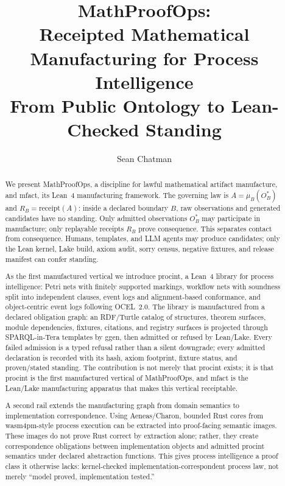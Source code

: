 \documentclass[11pt]{article}
\title{MathProofOps:\\Receipted Mathematical Manufacturing for Process Intelligence\\
\large From Public Ontology to Lean-Checked Standing}
\author{Sean Chatman}
\date{}
\begin{document}
\maketitle

\begin{abstract}
We present \textsf{MathProofOps}, a discipline for lawful mathematical
artifact manufacture, and \textsf{mfact}, its Lean~4 manufacturing
framework. The governing law is \(A = \mu_B(O^*_B)\) and \(R_B =
\mathrm{receipt}(A)\): inside a declared boundary \(B\), raw observations
and generated candidates have no standing. Only admitted observations
\(O^*_B\) may participate in manufacture; only replayable receipts \(R_B\)
prove consequence. This separates contact from consequence. Humans,
templates, and LLM agents may produce candidates; only the Lean kernel,
Lake build, axiom audit, sorry census, negative fixtures, and release
manifest can confer standing.

As the first manufactured vertical we introduce \textsf{procint}, a Lean~4
library for process intelligence: Petri nets with finitely supported
markings, workflow nets with soundness split into independent clauses,
event logs and alignment-based conformance, and object-centric event logs
following OCEL~2.0. The library is manufactured from a declared obligation
graph: an RDF/Turtle catalog of structures, theorem surfaces, module
dependencies, fixtures, citations, and registry surfaces is projected
through SPARQL-in-Tera templates by \textsf{ggen}, then admitted or
refused by Lean/Lake. Every failed admission is a typed refusal rather
than a silent downgrade; every admitted declaration is recorded with its
hash, axiom footprint, fixture status, and proven/stated standing. The
contribution is not merely that \textsf{procint} exists; it is that
\textsf{procint} is the first manufactured vertical of MathProofOps, and
\textsf{mfact} is the Lean/Lake manufacturing apparatus that makes this
vertical receiptable.

A second rail extends the manufacturing graph from domain semantics to
implementation correspondence. Using Aeneas/Charon, bounded Rust cores from
\textsf{wasm4pm}-style process execution can be extracted into
proof-facing semantic images. These images do not prove Rust correct by
extraction alone; rather, they create correspondence obligations between
implementation objects and admitted \textsf{procint} semantics under
declared abstraction functions. This gives process intelligence a proof
class it otherwise lacks: kernel-checked implementation-correspondent
process law, not merely ``model proved, implementation tested.''


\end{abstract}
\end{document}
